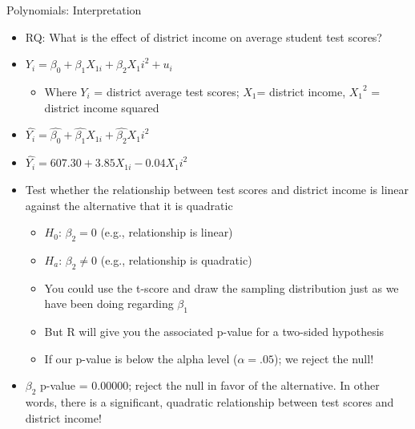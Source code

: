 \documentclass[
  8pt,
  ignorenonframetext,
  dvipsnames]{beamer}
\providecommand{\tightlist}{%
  \setlength{\itemsep}{0pt}\setlength{\parskip}{0pt}}
\let\olditem\item
\renewcommand{\item}{%
  \olditem\vspace{4pt}
}
\begin{document}
\begin{frame}{Polynomials: Interpretation}
\protect\hypertarget{polynomials-interpretation}{}

\begin{itemize}
\tightlist
\item
  RQ: What is the effect of district income on average student test
  scores?
\item
  \(Y_i = \beta_0 + \beta_1X_{1i} + \beta_2{X_1i}^2 + u_i\)

  \begin{itemize}
  \tightlist
  \item
    Where \(Y_i\) = district average test scores; \(X_1\)= district
    income, \({X_1}^2\) = district income squared
  \end{itemize}
\item
  \(\hat{Y_i} = \hat{\beta_0} + \hat{\beta_1}X_{1i} + \hat{\beta_2}{X_1i}^2\)
\item
  \(\hat{Y_i} = 607.30 + 3.85X_{1i} - 0.04{X_1i}^2\)
\item
  Test whether the relationship between test scores and district income
  is linear against the alternative that it is quadratic

  \begin{itemize}
  \tightlist
  \item
    \(H_0\): \(\beta_2 = 0\) (e.g., relationship is linear)
  \item
    \(H_a\): \(\beta_2 \ne 0\) (e.g., relationship is quadratic)
  \item
    You could use the t-score and draw the sampling distribution just as
    we have been doing regarding \(\beta_1\)
  \item
    But R will give you the associated p-value for a two-sided
    hypothesis
  \item
    If our p-value is below the alpha level (\(\alpha= .05\)); we reject
    the null!
  \end{itemize}
\item
  \(\beta_2\) p-value = 0.00000; reject the null in favor of the
  alternative. In other words, there is a significant, quadratic
  relationship between test scores and district income!
\end{itemize}

\end{frame}
\end{document}
